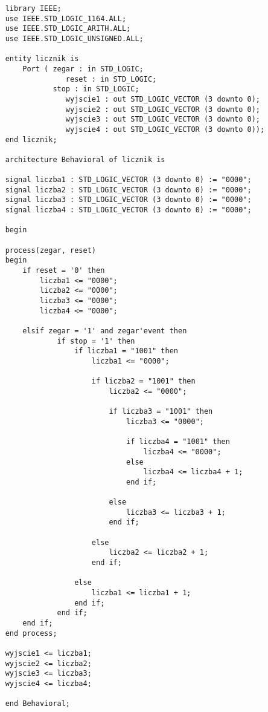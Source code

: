 \begin{lstlisting}
    library IEEE;
    use IEEE.STD_LOGIC_1164.ALL;
    use IEEE.STD_LOGIC_ARITH.ALL;
    use IEEE.STD_LOGIC_UNSIGNED.ALL;
    
    entity licznik is
        Port ( zegar : in STD_LOGIC;
                  reset : in STD_LOGIC;
               stop : in STD_LOGIC;
                  wyjscie1 : out STD_LOGIC_VECTOR (3 downto 0);
                  wyjscie2 : out STD_LOGIC_VECTOR (3 downto 0);
                  wyjscie3 : out STD_LOGIC_VECTOR (3 downto 0);
                  wyjscie4 : out STD_LOGIC_VECTOR (3 downto 0));
    end licznik;
    
    architecture Behavioral of licznik is
    
    signal liczba1 : STD_LOGIC_VECTOR (3 downto 0) := "0000";
    signal liczba2 : STD_LOGIC_VECTOR (3 downto 0) := "0000";
    signal liczba3 : STD_LOGIC_VECTOR (3 downto 0) := "0000";
    signal liczba4 : STD_LOGIC_VECTOR (3 downto 0) := "0000";
     
    begin
     
    process(zegar, reset)
    begin
        if reset = '0' then
            liczba1 <= "0000";
            liczba2 <= "0000";
            liczba3 <= "0000";
            liczba4 <= "0000";
            
        elsif zegar = '1' and zegar'event then
                if stop = '1' then			
                    if liczba1 = "1001" then
                        liczba1 <= "0000";
                        
                        if liczba2 = "1001" then
                            liczba2 <= "0000";
                            
                            if liczba3 = "1001" then
                                liczba3 <= "0000";
                                
                                if liczba4 = "1001" then
                                    liczba4 <= "0000";
                                else
                                    liczba4 <= liczba4 + 1;
                                end if;
                                
                            else
                                liczba3 <= liczba3 + 1;
                            end if;		
                            
                        else
                            liczba2 <= liczba2 + 1;
                        end if;
                        
                    else
                        liczba1 <= liczba1 + 1;
                    end if;
                end if;
        end if;
    end process;
    
    wyjscie1 <= liczba1;
    wyjscie2 <= liczba2;
    wyjscie3 <= liczba3;
    wyjscie4 <= liczba4;
    
    end Behavioral;
\end{lstlisting}